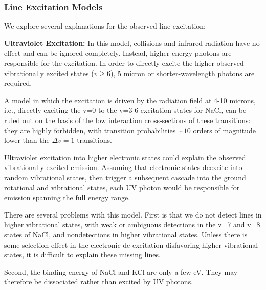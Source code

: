 \documentclass[twocolumn]{aastex62}
\begin{document}

\subsubsection{Line Excitation Models}
We explore several explanations for the observed line excitation:

\par{\textbf{Ultraviolet Excitation:}}
In this model, collisions and infrared radiation have no effect and can be
ignored completely.  Instead, higher-energy photons are responsible for the
excitation.  In order to directly excite the higher observed vibrationally
excited states ($v\geq6$), 5 micron or shorter-wavelength photons are required.

A model in which the excitation is driven by the radiation field at 4-10 microns,
i.e., directly exciting the v=0 to the v=3-6 excitation states for NaCl,
can be ruled out on the basis of the low interaction cross-sections of these
transitions: they are highly forbidden, with transition probabilities $\sim10$
orders of magnitude lower than the $\Delta v=1$ transitions.

Ultraviolet excitation into higher electronic states could explain the observed
vibrationally excited emission.  Assuming that electronic states deexcite into
random vibrational states, then trigger a subsequent cascade into the ground
rotational and vibrational states, each UV photon would be responsible for emission
spanning the full energy range.

There are several problems with this model.  First is that we do not detect lines
in higher vibrational states, with weak or ambiguous detections in the v=7 and v=8 
states of NaCl, and nondetections in higher vibrational states.  Unless there is
some selection effect in the electronic de-excitation disfavoring higher vibrational
states, it is difficult to explain these missing lines.  

Second, the binding energy of NaCl and KCl are only a few eV.  They may therefore
be dissociated rather than excited by UV photons.
\end{document}
